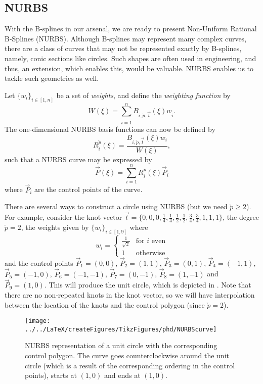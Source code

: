 \subsection{NURBS}
\renewcommand{\Xi}{{\vec{t}}}
With the B-splines in our arsenal, we are ready to present Non-Uniform Rational B-Splines (NURBS). Although B-splines may represent many complex curves, there are a class of curves that may not be represented exactly by B-splines, namely, conic sections like circles. Such shapes are often used in engineering, and thus, an extension, which enables this, would be valuable. NURBS enables us to tackle such geometries as well. 

Let $\{w_i\}_{i\in [1,n]}$ be a set of \textit{weights}, and define the \textit{weighting function} by
\begin{equation*}
	W(\xi) = \sum_{\tilde{i}=1}^{n} B_{\tilde{i},\check{p},\Xi}(\xi) w_{\tilde{i}}.
\end{equation*}
The one-dimensional NURBS basis functions can now be defined by
\begin{equation*}
	R_i^{\check{p}}(\xi) = \frac{B_{i,\check{p},\Xi}(\xi)w_i}{W(\xi)},
\end{equation*}
such that a NURBS curve may be expressed by
\begin{equation*}
	\vec{P}(\xi)=\sum_{i=1}^{n} R_i^{\check{p}}(\xi) \vec{P}_i
\end{equation*}
where $\vec{P}_i$ are the control points of the curve.

There are several ways to construct a circle using NURBS (but we need ${\check{p}\geq 2}$). For example, consider the knot vector $\Xi = \{0, 0, 0, \frac14, \frac14, \frac12, \frac12, \frac34, \frac34, 1, 1, 1\}$, the degree $\check{p}=2$, the weights given by $\{w_i\}_{i\in [1,9]}$ where
\begin{equation*}
	w_i = \begin{cases}
		\frac{1}{\sqrt{2}}& \text{for } i \text{ even}\\
		1& \text{otherwise}
	\end{cases}
\end{equation*}
and the control points $\vec{P}_1 = (0,0)$, $\vec{P}_2 = (1,1)$, $\vec{P}_3 = (0,1)$, $\vec{P}_4 = (-1,1)$, $\vec{P}_5 = (-1,0)$, $\vec{P}_6 = (-1,-1)$, $\vec{P}_7 = (0,-1)$, $\vec{P}_8 = (1,-1)$ and $\vec{P}_9 = (1,0)$. This will produce the unit circle, which is depicted in . Note that there are no non-repeated knots in the knot vector, so we will have interpolation between the location of the knots and the control polygon (since $\check{p} = 2$).
\begin{figure}
	\centering
	\texttt{[image: ../../LaTeX/createFigures/TikzFigures/phd/NURBScurve]} 
	\caption[NURBS representation of a unit circle]{NURBS representation of a unit circle with the corresponding control polygon. The curve goes counterclockwise around the unit circle (which is a result of the corresponding ordering in the control points), starts at $(1,0)$ and ends at $(1,0)$.}\label{Fig:NURBScurve}
\end{figure}

